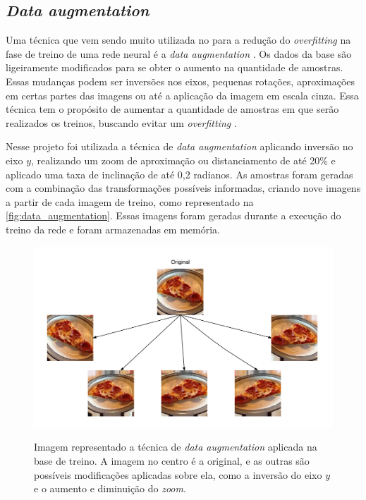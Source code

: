 \subsection{\textit{Data augmentation}}
Uma técnica que vem sendo muito utilizada no para a redução do \textit{overfitting} na fase de treino de uma rede neural é a \textit{data augmentation} \cite{cui2015data}. 
Os dados da base são ligeiramente modificados para se obter o aumento na quantidade de amostras.
Essas mudanças podem ser inversões nos eixos, pequenas rotações, aproximações em certas partes das imagens ou até a aplicação da imagem em escala cinza.
Essa técnica tem o propósito de aumentar a quantidade de amostras em que serão realizados os treinos, buscando evitar um \textit{overfitting} \cite{imaginetArticle}.
\par Nesse projeto foi utilizada a técnica de \textit{data augmentation} aplicando inversão no eixo $y$, realizando um zoom de aproximação ou distanciamento de até 20\% e aplicado uma taxa de inclinação de até 0,2 radianos. As amostras foram geradas com a combinação das transformações possíveis informadas, criando nove imagens a partir de cada imagem de treino, como representado na \autoref{fig:data_augmentation}. Essas imagens foram geradas durante a execução do treino da rede e foram armazenadas em memória.

\begin{figure}[H]
  \centering
  \caption{Imagem representado a técnica de \textit{data augmentation} aplicada na base de treino. A imagem no centro é a original, e as outras são possíveis modificações aplicadas sobre ela, como a inversão do eixo $y$ e o aumento e diminuição do \textit{zoom}.}
  \includegraphics[width=500pt]{dados/figuras/data_augmentation}
  \label{fig:data_augmentation}
\end{figure}

